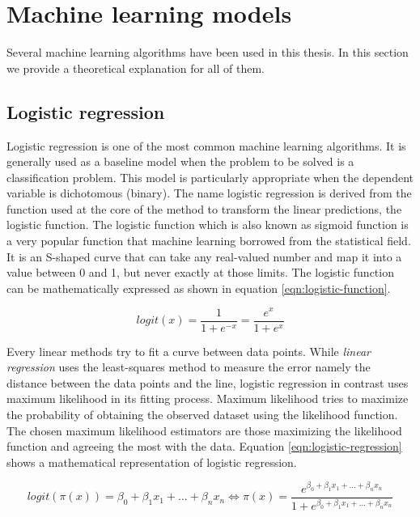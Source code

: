 \documentclass[LaM,binding=0.6cm, english]{sapthesis}
\begin{document}
\section{Machine learning models}

Several machine learning algorithms have been used in this thesis. In this section we provide a theoretical explanation for all of them.

\subsection{Logistic regression}

Logistic regression is one of the most common machine learning algorithms. It is generally used as a baseline model when the problem to be solved is a classification problem. This model is particularly appropriate when the dependent variable is dichotomous (binary).\cite{Sahar2018} The name logistic regression is derived from the function used at the core of the method to transform the linear predictions, the logistic function. The logistic function which is also known as sigmoid function is a very popular function that machine learning borrowed from the statistical field. It is an S-shaped curve that can take any real-valued number and map it into a value between 0 and 1, but never exactly at those limits. The logistic function can be mathematically expressed as shown in equation \ref{eqn:logistic-function}.

\begin{equation}
\label{eqn:logistic-function}
logit(x) = \frac{1}{1 + e^{-x}} = \frac{e^x}{1 + e^x}
\end{equation}

\par Every linear methods try to fit a curve between data points. While \textit{linear regression} uses the least-squares method to measure the error namely the distance between the data points and the line, logistic regression in contrast uses maximum likelihood in its fitting process. Maximum likelihood tries to maximize the probability of obtaining the observed dataset using the likelihood function. The chosen maximum likelihood estimators are those maximizing the likelihood function and agreeing the most with the data. Equation \ref{eqn:logistic-regression} shows a mathematical representation of logistic regression.

\begin{equation}
\label{eqn:logistic-regression}
logit(\pi(x)) = \beta_0 + \beta_1x_1 + ... + \beta_nx_n \Longleftrightarrow \pi(x) = \frac{e^{\beta_0 + \beta_1x_1 + ... + \beta_nx_n}}{1 + e^{\beta_0 + \beta_1x_1 + ... + \beta_nx_n}}
\end{equation}
\end{document}
